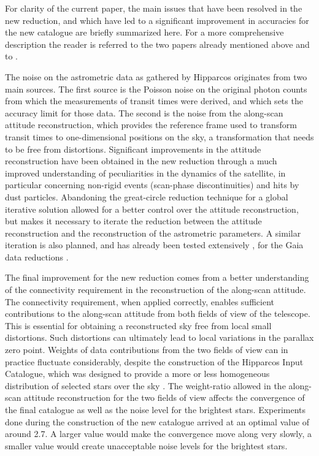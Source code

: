 \documentclass{aa}
\begin{document}
For clarity of the current paper, the main issues that have been resolved
in the new reduction, and which have led to a significant improvement in
accuracies for the new catalogue are briefly summarized here. For a more
comprehensive description the reader is referred to the two papers already
mentioned above \citep{fvl05a, fvl05b} and to \citet{fvl07}. 

The noise on the astrometric data as gathered by Hipparcos originates from 
two main sources. The first source is the Poisson noise on the original photon 
counts from which the measurements of transit times were derived, and which 
sets the accuracy limit for those data. The second is the noise from the 
along-scan attitude reconstruction, which provides the reference frame used to
transform transit times to one-dimensional positions on the sky, a 
transformation that needs to be free from distortions. Significant 
improvements in the attitude reconstruction have been obtained in the new 
reduction through a much improved understanding of peculiarities in the 
dynamics of the satellite, in particular concerning
non-rigid events (scan-phase discontinuities) and hits by dust particles. 
Abandoning the great-circle reduction technique \citep{vdmar88,vdmar92} 
for a global iterative solution allowed for a better control over the 
attitude reconstruction, but makes it necessary to iterate the reduction
between the attitude reconstruction and the reconstruction of the astrometric
parameters. A similar iteration is also planned, and has already been tested
extensively \citep{omullane06}, for the Gaia data reductions \citep{lindeg05}.

The final improvement for the new reduction comes from a better understanding
of the connectivity requirement in the reconstruction of the along-scan 
attitude. The connectivity requirement, when applied correctly, enables
sufficient contributions to the along-scan attitude from both fields of 
view of the telescope. This is essential for obtaining a reconstructed sky
free from local small distortions. Such distortions can ultimately lead to
local variations in the parallax zero point. Weights of data contributions from
the two fields of view can in practice fluctuate considerably, despite
the construction of the Hipparcos Input Catalogue, which was designed to 
provide a more or less homogeneous distribution of selected stars over the
sky \citep{esa92}. The weight-ratio allowed in the along-scan attitude
reconstruction for the two fields of view affects the convergence of
the final catalogue as well as the noise level for the brightest stars. 
Experiments done during the construction of the new catalogue arrived 
at an optimal value of around 2.7. A larger value would make the convergence
move along very slowly, a smaller value would create unacceptable noise levels
for the brightest stars. 
\end{document}
